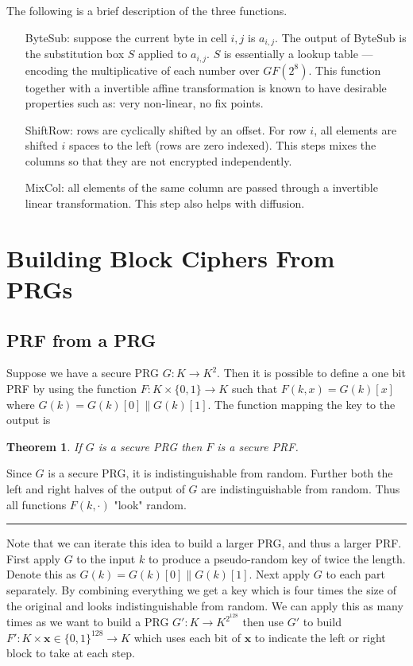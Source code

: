 \documentclass[twoside]{article}
\newcounter{lecnum}
\newtheorem{theorem}{Theorem}[lecnum]
\newenvironment{proof}{{\bf Proof:}}{\hfill\rule{2mm}{2mm}}
\begin{document}
The following is a brief description of the three functions.
\begin{enumerate}
\item[ByteSub:] suppose the current byte in cell $i,j$ is $a_{i,j}$. The output of ByteSub is the substitution box $S$ applied to $a_{i,j}$. $S$ is essentially a lookup table --- encoding the multiplicative of each number over $GF(2^{8})$. This function together with a invertible affine transformation is known to have desirable properties such as: very non-linear, no fix points.
\item[ShiftRow:] rows are cyclically shifted by an offset. For row $i$, all elements are shifted $i$ spaces to the left (rows are zero indexed). This steps mixes the columns so that they are not encrypted independently. 
\item[MixCol:] all elements of the same column are passed through a invertible linear transformation. This step also helps with diffusion.
\end{enumerate}

\section{Building Block Ciphers From PRGs}
\subsection{PRF from a PRG}
Suppose we have a secure PRG $G: K \rightarrow K^2$. Then it is possible to define a one bit PRF by using the function $F: K \times \{0,1\} \rightarrow K$ such that $F(k, x) = G(k)[x]$ where $G(k) = G(k)[0] \parallel G(k)[1]$. The function mapping the key to the output is 

\begin{theorem}
If $G$ is a secure PRG then $F$ is a secure PRF.
\end{theorem}
\begin{proof}
Since $G$ is a secure PRG, it is indistinguishable from random. Further both the left and right halves of the output of $G$ are indistinguishable from random. Thus all functions $F(k, \cdot)$ "look" random.
\end{proof}

Note that we can iterate this idea to build a larger PRG, and thus a larger PRF. First apply $G$ to the input $k$ to produce a pseudo-random key of twice the length. Denote this as $G(k) = G(k)[0] \parallel G(k)[1]$. Next apply $G$ to each part separately. By combining everything we get a key which is four times the size of the original and looks indistinguishable from random. We can apply this as many times as we want to build a PRG $G': K \rightarrow K^{2^{128}}$ then use $G'$ to build $F': K \times \mathbf{x} \in \{0,1\}^{128} \rightarrow K$ which uses each bit of $\mathbf{x}$ to indicate the left or right block to take at each step. 
\end{document}
